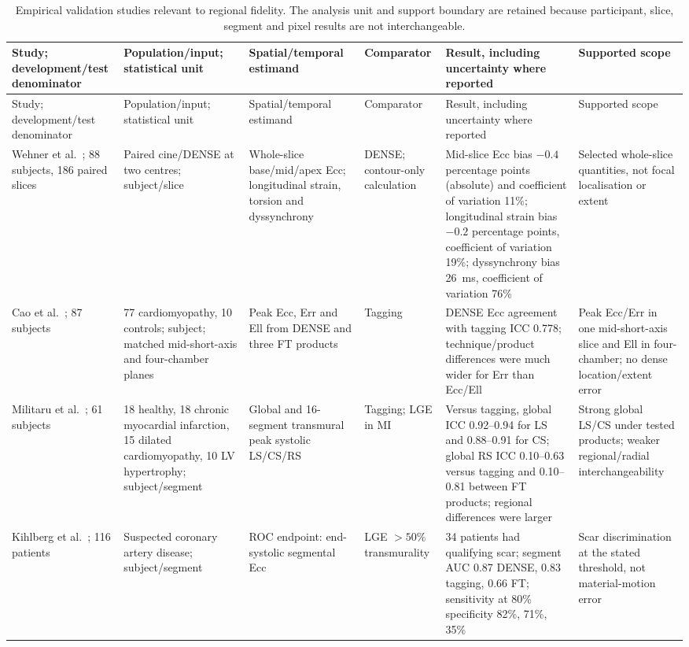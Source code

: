{\scriptsize\sloppy
\setlength{\tabcolsep}{2pt}
\begin{longtable}{L{0.11\textwidth}L{0.13\textwidth}L{0.14\textwidth}L{0.13\textwidth}L{0.20\textwidth}L{0.10\textwidth}}
\caption{Empirical validation studies relevant to regional fidelity. The analysis unit and support boundary are retained because participant, slice, segment and pixel results are not interchangeable.}\label{tab:evidence}\\
\toprule
Study; development/test denominator & Population/input; statistical unit & Spatial/temporal estimand & Comparator & Result, including uncertainty where reported & Supported scope \\
\midrule
\endfirsthead
\toprule
Study; development/test denominator & Population/input; statistical unit & Spatial/temporal estimand & Comparator & Result, including uncertainty where reported & Supported scope \\
\midrule
\endhead
Wehner et al.~\cite{wehner2018}; 88 subjects, 186 paired slices & Paired cine/DENSE at two centres; subject/slice & Whole-slice base/mid/apex Ecc; longitudinal strain, torsion and dyssynchrony & DENSE; contour-only calculation & Mid-slice Ecc bias $-0.4$ percentage points (absolute) and coefficient of variation 11\%; longitudinal strain bias $-0.2$ percentage points, coefficient of variation 19\%; dyssynchrony bias 26~ms, coefficient of variation 76\% & Selected whole-slice quantities, not focal localisation or extent \\
\addlinespace
Cao et al.~\cite{cao2018}; 87 subjects & 77 cardiomyopathy, 10 controls; subject; matched mid-short-axis and four-chamber planes & Peak Ecc, Err and Ell from DENSE and three FT products & Tagging & DENSE Ecc agreement with tagging ICC 0.778; technique/product differences were much wider for Err than Ecc/Ell & Peak Ecc/Err in one mid-short-axis slice and Ell in four-chamber; no dense location/extent error \\
\addlinespace
Militaru et al.~\cite{militaru2021}; 61 subjects & 18 healthy, 18 chronic myocardial infarction, 15 dilated cardiomyopathy, 10 LV hypertrophy; subject/segment & Global and 16-segment transmural peak systolic LS/CS/RS & Tagging; LGE in MI & Versus tagging, global ICC 0.92--0.94 for LS and 0.88--0.91 for CS; global RS ICC 0.10--0.63 versus tagging and 0.10--0.81 between FT products; regional differences were larger & Strong global LS/CS under tested products; weaker regional/radial interchangeability \\
\addlinespace
Kihlberg et al.~\cite{kihlberg2020clinical}; 116 patients & Suspected coronary artery disease; subject/segment & ROC endpoint: end-systolic segmental Ecc & LGE $>50\%$ transmurality & 34 patients had qualifying scar; segment AUC 0.87 DENSE, 0.83 tagging, 0.66 FT; sensitivity at 80\% specificity 82\%, 71\%, 35\% & Scar discrimination at the stated threshold, not material-motion error \\

\end{longtable}}
